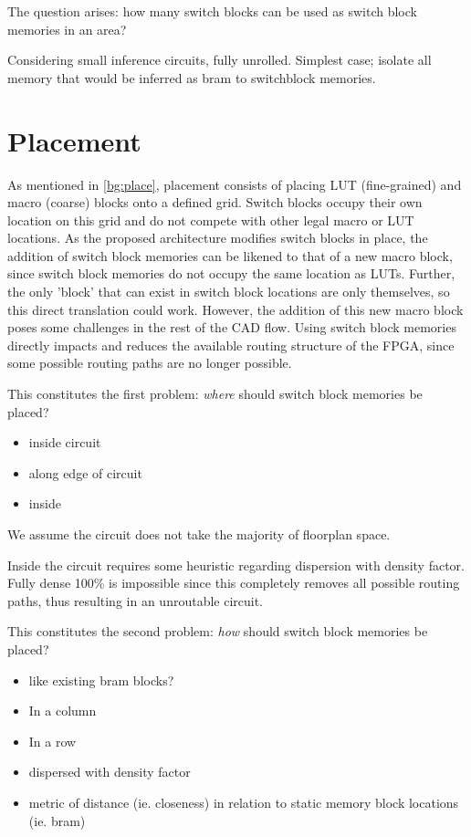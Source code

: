 The question arises: how many switch blocks can be used as switch block memories in an area?

Considering small inference circuits, fully unrolled. Simplest case; isolate all memory that would be inferred as bram to switchblock memories.

\section{Placement}
\label{cad:place}

As mentioned in \ref{bg:place}, placement consists of placing LUT (fine-grained) and macro (coarse) blocks onto a defined grid. Switch blocks occupy their own location on this grid and do not compete with other legal macro or LUT locations. 
As the proposed architecture modifies switch blocks in place, the addition of switch block memories can be likened to that of a new macro block, since switch block memories do not occupy the same location as LUTs. Further, the only 'block' that can exist in switch block locations are only themselves, so this direct translation could work.
However, the addition of this new macro block poses some challenges in the rest of the CAD flow. 
Using switch block memories directly impacts and reduces the available routing structure of the FPGA, since some possible routing paths are no longer possible.

This constitutes the first problem: \textit{where} should switch block memories be placed?

\begin{itemize}
    \item inside circuit 
    \item along edge of circuit
    \item inside 
\end{itemize}

We assume the circuit does not take the majority of floorplan space.

Inside the circuit requires some heuristic regarding dispersion with density factor. Fully dense 100\% is impossible since this completely removes all possible routing paths, thus resulting in an unroutable circuit.

This constitutes the second problem: \textit{how} should switch block memories be placed?

\begin{itemize}
    \item like existing bram blocks?
    \item In a column
    \item In a row
    \item dispersed with density factor
    \item metric of distance (ie. closeness) in relation to static memory block locations (ie. bram)
\end{itemize}

